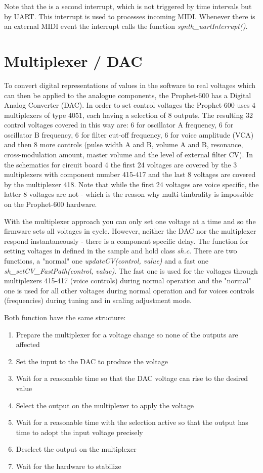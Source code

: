 \documentclass[portrait, 11pt, oneside]{report}
\begin{document}
Note that the is a second interrupt, which is not triggered by time intervals but by UART. This interrupt is used to processes incoming MIDI. Whenever there is an external MIDI event the interrupt calls the function \textit{synth\_uartInterrupt()}.

\section{Multiplexer / DAC}\label{potmux}

To convert digital representations of values in the software to real voltages which can then be applied to the analogue components, the Prophet-600 has a Digital Analog Converter (DAC). In order to set  control voltages the Prophet-600 uses 4 multiplexers of type 4051, each having a selection of 8 outputs. The resulting 32 control voltages covered in this way are: 6 for oscillator A frequency, 6 for oscillator B frequency,  6 for filter cut-off frequency, 6 for voice amplitude (VCA) and then 8 more controls (pulse width A and B, volume A and B, resonance, cross-modulation amount, master volume and the level of external filter CV). In the schematics for circuit board 4 the first 24 voltages are covered by the 3 multiplexers with component number 415-417 and the last 8 voltages are covered by the multiplexer 418. Note that while the first 24 voltages are voice specific, the latter 8 voltages are not - which is the reason why multi-timbrality is impossible on the Prophet-600 hardware.

With the multiplexer approach you can only set one voltage at a time and so the firmware sets all voltages in cycle. However, neither the DAC nor the multiplexer respond instantaneously - there is a component specific delay. The function for setting voltages in defined in the sample and hold class \textit{sh.c}. There are two functions, a "normal" one \textit{updateCV(control, value)} and a fast one \textit{sh\_setCV\_FastPath(control, value)}. The fast one is used for the voltages through multiplexers 415-417 (voice controls) during normal operation and the "normal" one is used for all other voltages during normal operation and for voices controls (frequencies) during tuning and in scaling adjustment mode.

Both function have the same structure:

\begin{enumerate}
  \item Prepare the multiplexer for a voltage change so none of the outputs are affected
  \item Set the input to the DAC to produce the voltage
  \item Wait for a reasonable time so that the DAC voltage can rise to the desired value  
  \item Select the output on the multiplexer to apply the voltage
  \item Wait for a reasonable time with the selection active so that the output has time to adopt the input voltage precisely
  \item Deselect the output on the multiplexer 
  \item Wait for the hardware to stabilize 
\end{enumerate} 
\end{document}
